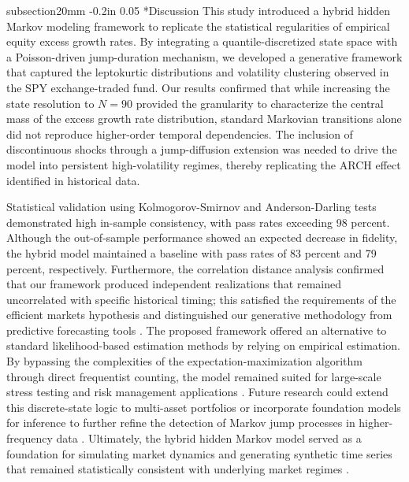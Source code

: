 \documentclass[12pt, letterpaper]{article}
\makeatletter
\renewcommand\section{\@startsection
	{subsection}{2}{0mm}
	{-0.2in}
	{0.05\baselineskip}
	{\normalfont\large\bfseries}}
\makeatother
\begin{document}
\section*{Discussion}
This study introduced a hybrid hidden Markov modeling framework to replicate the statistical regularities of empirical equity excess growth rates. By integrating a quantile-discretized state space with a Poisson-driven jump-duration mechanism, we developed a generative framework that captured the leptokurtic distributions and volatility clustering observed in the SPY exchange-traded fund. Our results confirmed that while increasing the state resolution to $N=90$ provided the granularity to characterize the central mass of the excess growth rate distribution, standard Markovian transitions alone did not reproduce higher-order temporal dependencies. The inclusion of discontinuous shocks through a jump-diffusion extension was needed to drive the model into persistent high-volatility regimes, thereby replicating the ARCH effect identified in historical data.

Statistical validation using Kolmogorov-Smirnov and Anderson-Darling tests demonstrated high in-sample consistency, with pass rates exceeding 98 percent. Although the out-of-sample performance showed an expected decrease in fidelity, the hybrid model maintained a baseline with pass rates of 83 percent and 79 percent, respectively. Furthermore, the correlation distance analysis confirmed that our framework produced independent realizations that remained uncorrelated with specific historical timing; this satisfied the requirements of the efficient markets hypothesis and distinguished our generative methodology from predictive forecasting tools \cite{fama_efficient_1970, assefa_generating_2021, kwon_can_2024}. The proposed framework offered an alternative to standard likelihood-based estimation methods by relying on empirical estimation. By bypassing the complexities of the expectation-maximization algorithm through direct frequentist counting, the model remained suited for large-scale stress testing and risk management applications \cite{ohara_market_1998, manganelli_2004, glasserman_monte_2003}. Future research could extend this discrete-state logic to multi-asset portfolios or incorporate foundation models for inference to further refine the detection of Markov jump processes in higher-frequency data \cite{dias_mixture_2010, berghaus_foundation_2025}. Ultimately, the hybrid hidden Markov model served as a foundation for simulating market dynamics and generating synthetic time series that remained statistically consistent with underlying market regimes \cite{nguyen_hidden_2018, hamilton_regime_2018}.
\end{document}
